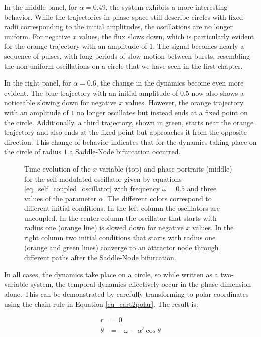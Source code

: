 \documentclass{article}
\begin{document}
In the middle panel, for $\alpha = 0.49$, the system exhibits a more interesting behavior. 
While the trajectories in phase space still describe circles with fixed radii corresponding to the initial amplitudes, the oscillations are no longer uniform. For negative $x$ values, the flux slows down, which is particularly evident for the orange trajectory with an amplitude of $1$. 
The signal becomes nearly a sequence of pulses, with long periods of slow motion between bursts, resembling the non-uniform oscillations on a circle that we have seen in the first chapter. 

In the right panel, for $\alpha = 0.6$, the change in the dynamics become even more evident. 
The blue trajectory with an initial amplitude of $0.5$ now also shows a noticeable slowing down for negative $x$ values. 
However, the orange trajectory with an amplitude of $1$ no longer oscillates but instead ends at a fixed point on the circle. 
Additionally, a third trajectory, shown in green, starts near the orange trajectory and also ends at the fixed point but approaches it from the opposite direction. 
This change of behavior indicates that for the dynamics taking place on the circle of radius $1$ a Saddle-Node bifurcation occurred.

\begin{figure} [h]
    \centerline{}
    \caption{Time evolution of the $x$ variable (top) and phase portraits (middle) for the self-modulated oscillator given by equations \ref{eq_self_coupled_oscillator} with frequency $\omega=0.5$ and three values of the parameter $\alpha$. 
    The different colors correspond to different initial conditions. In the left column the oscillators are uncoupled. In the center column the oscillator that starts with radius one (orange line) is slowed down for negative $x$ values. In the right column two initial conditions that starts with radius one (orange and green lines) converge to an attractor node through different paths after the Saddle-Node bifurcation.
    }
    \label{fig_selfmod}
\end{figure}

In all cases, the dynamics take place on a circle, so while written as a two-variable system, the temporal dynamics effectively occur in the phase dimension alone. This can be demonstrated by carefully transforming to polar coordinates using the chain rule in Equation \ref{eq_cart2polar}. The result is:

\begin{subequations} \label{eq_self_coupled_oscillator_polar}
\begin{align} 
    \dot{r} & = 0 \\
    \dot{\theta} & = -\omega - \alpha' \cos{\theta}
\end{align}
\end{subequations}
\end{document}
